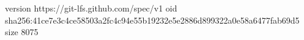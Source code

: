 version https://git-lfs.github.com/spec/v1
oid sha256:41ce7e3c4ce58503a2fc4c94e55b19232e5e2886d899322a0e58a6477fab69d5
size 8075
